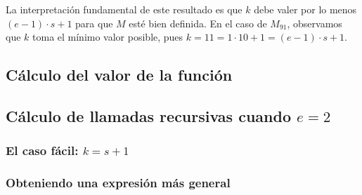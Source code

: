\documentclass[a4paper,10pt]{article}
\begin{document}
La interpretaci\'on fundamental de este resultado es que $k$ debe valer por lo menos $(e-1)\cdot s + 1$ para que
$M$ est\'e bien definida. En el caso de $M_{91}$, observamos que $k$ toma el m\'inimo valor posible, pues
$k = 11 = 1 \cdot 10 + 1 = (e - 1) \cdot s + 1$.

\subsection{C\'alculo del valor de la funci\'on}

\subsection{C\'alculo de llamadas recursivas cuando $e = 2$}

\subsubsection{El caso f\'acil: $k = s + 1$}

\subsubsection{Obteniendo una expresi\'on m\'as general}
\end{document}
